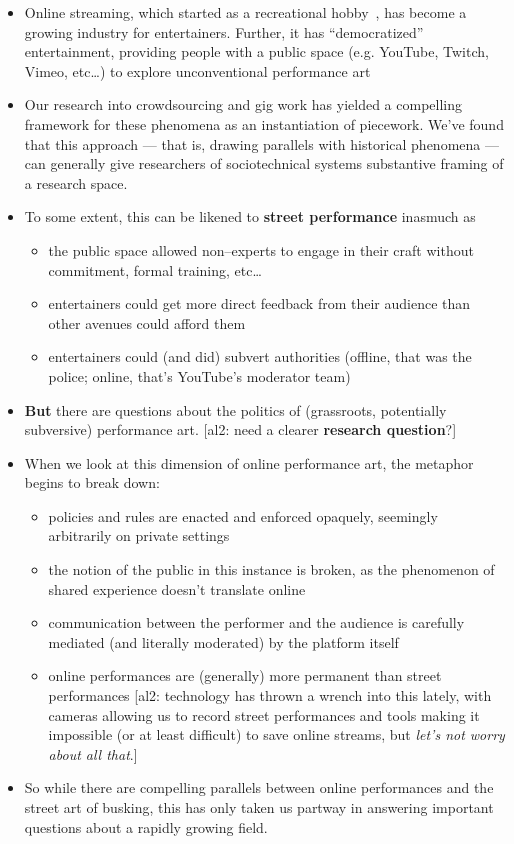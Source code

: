 \documentclass[10pt]{article}
\newcommand{\ali}[1]{{\color{Red}[al2: #1]}}
\begin{document}
\begin{itemize}
  \item Online streaming, which started as a recreational hobby~\cite{Hamilton:2014:STF:2611105.2557048,Zhang:2015:CIL:2736084.2736091}, has become
        a growing industry for entertainers.
        Further, it has ``democratized'' entertainment, providing people with a public space
        (e.g. YouTube, Twitch, Vimeo, etc\dots) to explore unconventional performance art
  \item Our research into crowdsourcing and gig work has yielded
        a compelling framework for these phenomena as an instantiation of piecework.
        We've found that this approach
        --- that is, drawing parallels with historical phenomena ---
        can generally give researchers of sociotechnical systems substantive framing of a research space.
  \item To some extent, this can be likened to \textbf{street performance} inasmuch as
  \begin{itemize}
    \item the public space allowed non--experts to engage in their craft without commitment, formal training, etc\dots
    \item entertainers could get more direct feedback from their audience than other avenues could afford them
    \item entertainers could (and did) subvert authorities (offline, that was the police; online, that's YouTube's moderator team)
  \end{itemize}
  \item \textbf{But} there are questions about the politics of (grassroots, potentially subversive) performance art.
        \ali{need a clearer \textbf{research question}?}
  \item When we look at this dimension of online performance art, the metaphor begins to break down:
  \begin{itemize}
    \item policies and rules are enacted and enforced opaquely, seemingly arbitrarily on private settings
    \item the notion of the public in this instance is broken, as the phenomenon of shared experience doesn't translate online
    \item communication between the performer and the audience is carefully mediated
          (and literally moderated) by the platform itself
    \item online performances are (generally) more permanent than street performances
          \ali{technology has thrown a wrench into this lately, with
              cameras allowing us to record street performances and
              tools making it impossible (or at least difficult) to save online streams, but
              \textit{let's not worry about all that}.}
  \end{itemize}
  \item So while there are compelling parallels between online performances and the street art of busking,
        this has only taken us partway in answering important questions about a rapidly growing field.
\end{itemize}
\end{document}
